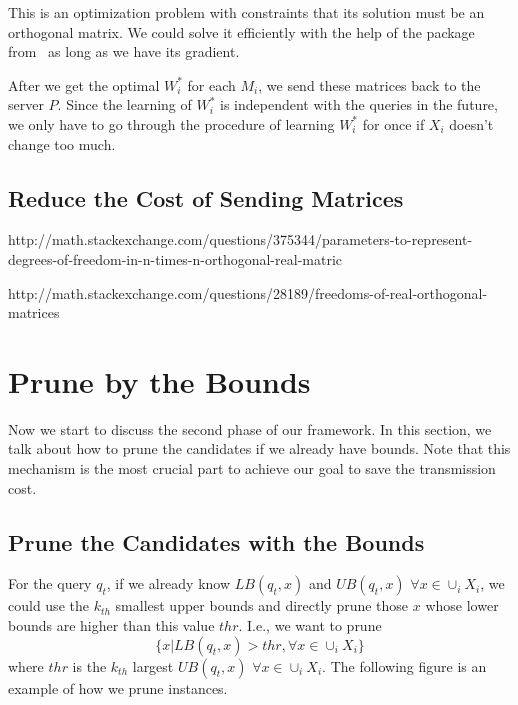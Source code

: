 This is an optimization problem with constraints that its solution must be an orthogonal matrix.  We could solve it efficiently with the help of the package from~\cite{Fopt} as long as we have its gradient. 

After we get the optimal $W^*_i$ for each $M_i$, we send these matrices back to the server $P$.  Since the learning of $W^*_i$ is independent with the queries in the future, we only have to go through the procedure of learning $W^*_i$ for once if $X_i$ doesn't change too much.


\subsection{Reduce the Cost of Sending Matrices} %
\label{ss:reduce_the_cost_of_sending_matrices}
http://math.stackexchange.com/questions/375344/parameters-to-represent-degrees-of-freedom-in-n-times-n-orthogonal-real-matric

http://math.stackexchange.com/questions/28189/freedoms-of-real-orthogonal-matrices



\section{Prune by the Bounds}
\label{s:prune}
Now we start to discuss the second phase of our framework.  In this section, we talk about how to prune the candidates if we already have bounds.  Note that this mechanism is the most crucial part to achieve our goal to save the transmission cost.


\subsection{Prune the Candidates with the Bounds} %
\label{ss:prune_the_candidates_with_the_bounds}

For the query $q_t$, if we already know $LB(q_t,x)$ and $UB(q_t,x)$ $\forall x\in \cup_i X_i$, we could use the $k_{th}$ smallest upper bounds and directly prune those $x$ whose lower bounds are higher than this value $thr$. I.e., we want to prune
\[
\{x |LB(q_t,x)>thr, \forall x \in \cup_i X_i\}
\]
where $thr$ is the $k_{th}$ largest $UB(q_t,x)$ $\forall x\in \cup_i X_i$.  The following figure is an example of how we prune instances.

